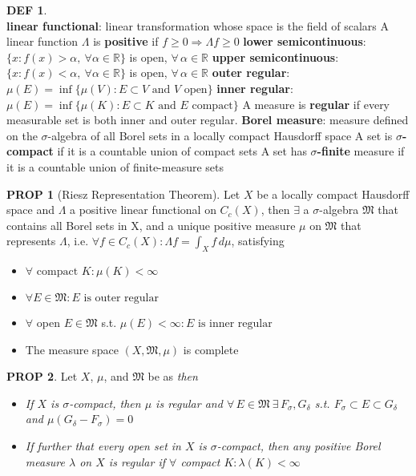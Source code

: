 \documentclass[hidelinks,10pt]{article}
\theoremstyle{definition}
\newtheorem*{defin}{DEF}
\theoremstyle{dotles}
\theoremstyle{dotless}
\newtheorem{proposition}{PROP}[section]
\theoremstyle{remark}
\begin{document}
\begin{defin}~\\
\textbf{linear functional}: linear transformation whose space is the field of scalars\newline
A linear function $\Lambda$ is \textbf{positive} if $f\geq0\Rightarrow\Lambda f\geq0$\bigbreak
\textbf{lower semicontinuous}: $\{x:f(x)>\alpha,\ \forall\alpha\in\mathbb{R}\}$ is open, $\forall\,\alpha\in\mathbb{R}$\newline
\textbf{upper semicontinuous}: $\{x:f(x)<\alpha,\ \forall\alpha\in\mathbb{R}\}$ is open, $\forall\,\alpha\in\mathbb{R}$\bigbreak
\textbf{outer regular}: $\mu(E)=\inf\{\mu(V):E\subset V\textrm{ and }V\textrm{ open}\}$\newline
\textbf{inner regular}: $\mu(E)=\inf\{\mu(K):E\subset K\textrm{ and }E\textrm{ compact}\}$\newline
A measure is \textbf{regular} if every measurable set is both inner and outer regular.\bigbreak
\textbf{Borel measure}: measure defined on the $\sigma$-algebra of all Borel sets in a locally compact Hausdorff space\bigbreak
A set is \textbf{$\sigma$-compact} if it is a countable union of compact sets\newline
A set has \textbf{$\sigma$-finite} measure if it is a countable union of finite-measure sets
\end{defin}

\begin{proposition}[Riesz Representation Theorem]\label{Prop 2.4}Let $X$ be a locally compact Hausdorff space and $\Lambda$ a positive linear functional on $C_c(X)$, then $\exists$ a $\sigma$-algebra $\mathfrak{M}$ that contains all Borel sets in X, and a unique positive measure $\mu$ on $\mathfrak{M}$ that represents $\Lambda$, i.e. $\forall f\in C_c(X):\Lambda  f=\int_Xf\,d\mu$, satisfying\begin{itemize}
    \item $\forall\textrm{ compact }K:\mu(K)<\infty$
    \item $\forall E\in\mathfrak{M}:E\textrm{ is outer regular}$
    \item $\forall$ open $E\in\mathfrak{M}$ s.t. $\mu(E)<\infty:E\textrm{ is inner regular}$
    \item The measure space $(X,\mathfrak{M},\mu)$ is complete
\end{itemize}
\end{proposition}

\begin{proposition}Let $X$, $\mu$, and $\mathfrak{M}$ be as \textit{ then}
\begin{itemize}
\item \textit{If $X$ is $\sigma$-compact, then $\mu$ is regular and $\forall\,E\in\mathfrak{M}\ \exists\,F_\sigma,G_\delta$ s.t. $F_\sigma\subset E\subset G_\delta$ and $\mu(G_\delta-F_\sigma)=0$}
\item \textit{If further that every open set in $X$ is $\sigma$-compact, then any positive Borel measure $\lambda$ on $X$ is regular if $\forall$ compact $K:\lambda(K)<\infty$}
\end{itemize}
\end{proposition}
\end{document}
